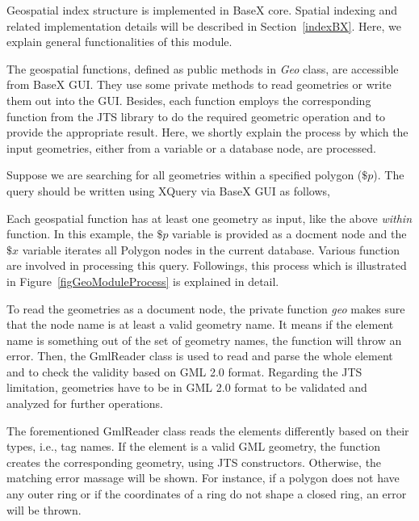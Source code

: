 \documentclass[a4paper,12pt]{article}
\begin{document}
Geospatial index structure is implemented in BaseX core. Spatial indexing and related implementation details will be described in Section~\ref{indexBX}. Here, we explain general functionalities of this module.

The geospatial functions, defined as public methods in \textit{Geo} class, are accessible from BaseX GUI. They use some private methods to read geometries or write them out into the GUI. Besides, each function employs the corresponding function from the JTS library to do the required geometric operation and to provide the appropriate result. Here, we shortly explain the process by which the input geometries, either from a variable or a database node, are processed.


Suppose we are searching for all geometries within a specified polygon ($\$p$). The query should be written using XQuery via BaseX GUI as follows,
\vspace{10px}
\vspace{10px}
Each geospatial function has at least one geometry as input, like the above \textit{within} function. In this example, the $\$p$ variable is provided as a docment node and the $\$x$ variable iterates all Polygon nodes in the current database. Various function are involved in processing this query. Followings, this process which is illustrated in Figure~\ref{figGeoModuleProcess} is explained in detail. 

To read the geometries as a document node, the private function \textit{geo} makes sure that the node name is at least a valid geometry name. It means if the element name is something out of the set of geometry names, the function will throw an error. 
Then, the GmlReader class is used to read and parse the whole element and to check the validity based on GML 2.0 format. Regarding the JTS limitation, geometries have to be in GML 2.0 format to be validated and analyzed for further operations. 

The forementioned GmlReader class reads the elements differently based on their types, i.e., tag names. If the element is a valid GML geometry, the function creates the corresponding geometry, using JTS constructors. Otherwise, the matching error massage will be shown. For instance, if a polygon does not have any outer ring or if the coordinates of a ring do not shape a closed ring, an error will be thrown. 
\end{document}

